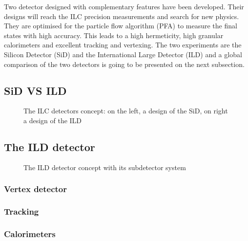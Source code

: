   Two detector designed with complementary features have been developed. 
  Their designs will reach the ILC precision measurements and search for new physics. 
  They are optimised for the particle flow algorithm (PFA) to measure the final states with high accuracy.
  This leads to a high hermeticity, high granular calorimeters and excellent tracking and vertexing. 
  The two experiments are the Silicon Detector (SiD) and the International Large Detector (ILD) and a global comparison of the two detectors is going to be presented on the next subsection.

      \subsection{SiD VS ILD}
    \begin{figure}
      \centering
      \caption{The ILC detectors concept: on the left, a design of the SiD, on right a design of the ILD }
      \label{fig:SiLD}
    \end{figure}    
    
    \subsection{The ILD detector}

    \begin{figure}
      \centering
      \caption{The ILD detector concept with its subdetector system}
      \label{fig:ILD}
    \end{figure}

      \subsubsection{Vertex detector}
      \subsubsection{Tracking}
      \subsubsection{Calorimeters}
